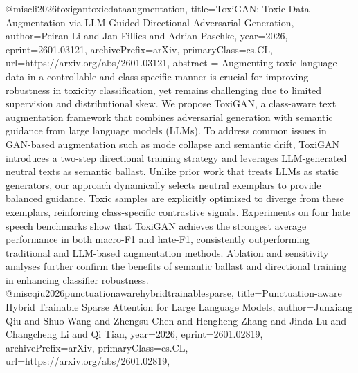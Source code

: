 {}@misc{li2026toxigantoxicdataaugmentation,
      title={ToxiGAN: Toxic Data Augmentation via LLM-Guided Directional Adversarial Generation}, 
      author={Peiran Li and Jan Fillies and Adrian Paschke},
      year={2026},
      eprint={2601.03121},
      archivePrefix={arXiv},
      primaryClass={cs.CL},
      url={https://arxiv.org/abs/2601.03121},
      abstract = {Augmenting toxic language data in a controllable and class-specific manner is crucial for improving robustness in toxicity classification, yet remains challenging due to limited supervision and distributional skew. We propose ToxiGAN, a class-aware text augmentation framework that combines adversarial generation with semantic guidance from large language models (LLMs). To address common issues in GAN-based augmentation such as mode collapse and semantic drift, ToxiGAN introduces a two-step directional training strategy and leverages LLM-generated neutral texts as semantic ballast. Unlike prior work that treats LLMs as static generators, our approach dynamically selects neutral exemplars to provide balanced guidance. Toxic samples are explicitly optimized to diverge from these exemplars, reinforcing class-specific contrastive signals. Experiments on four hate speech benchmarks show that ToxiGAN achieves the strongest average performance in both macro-F1 and hate-F1, consistently outperforming traditional and LLM-based augmentation methods. Ablation and sensitivity analyses further confirm the benefits of semantic ballast and directional training in enhancing classifier robustness.}
}@misc{qiu2026punctuationawarehybridtrainablesparse,
      title={Punctuation-aware Hybrid Trainable Sparse Attention for Large Language Models}, 
      author={Junxiang Qiu and Shuo Wang and Zhengsu Chen and Hengheng Zhang and Jinda Lu and Changcheng Li and Qi Tian},
      year={2026},
      eprint={2601.02819},
      archivePrefix={arXiv},
      primaryClass={cs.CL},
      url={https://arxiv.org/abs/2601.02819},
}
